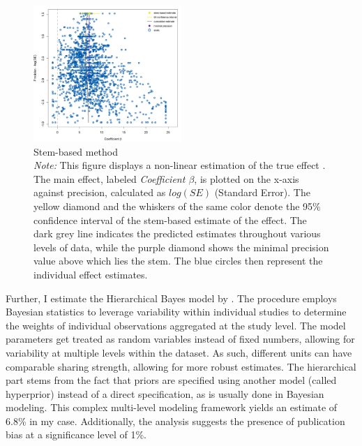 \begin{figure}
\centering
\captionsetup{font = scriptsize}
\caption[Stem-based method]{\vspace{0.5cm}Stem-based method\\ \emph{Note:} This figure displays a non-linear estimation of the true effect \citep{Furukawa2019Stem}. The main effect, labeled \textit{Coefficient $\beta$}, is plotted on the x-axis against precision, calculated as $log(SE)$ (Standard Error). The yellow diamond and the whiskers of the same color denote the 95\% confidence interval of the stem-based estimate of the effect. The dark grey line indicates the predicted estimates throughout various levels of data, while the purple diamond shows the minimal precision value above which lies the stem. The blue circles then represent the individual effect estimates.}
\label{fig:stem}
\includegraphics[width=0.5\textwidth]{Figures/stem.png}
\end{figure}

Further, I estimate the Hierarchical Bayes model by \cite{Allenby2006Hier}. The procedure employs Bayesian statistics to leverage variability within individual studies to determine the weights of individual observations aggregated at the study level. The model parameters get treated as random variables instead of fixed numbers, allowing for variability at multiple levels within the dataset. As such, different units can have comparable sharing strength, allowing for more robust estimates. The hierarchical part stems from the fact that priors are specified using another model (called hyperprior) instead of a direct specification, as is usually done in Bayesian modeling. This complex multi-level modeling framework yields an estimate of 6.8\% in my case. Additionally, the analysis suggests the presence of publication bias at a significance level of 1\%.

